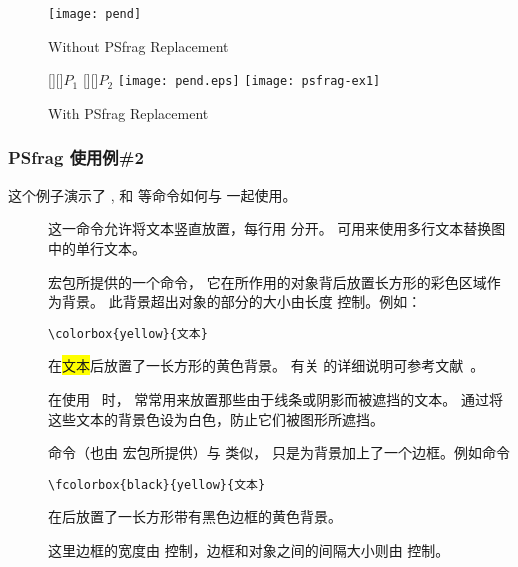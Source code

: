 \begin{figure}
\begin{minipage}[t]{.5\textwidth}
\vspace{0pt}
\centering
\texttt{[image: pend]}
\caption{Without PSfrag Replacement}\label{fig:nopsfrag}
\end{minipage}%
\begin{minipage}[t]{.5\textwidth}
\vspace{0pt}
\centering
\ifdvips
{}
[][]{$P_1$}
[][]{\large $P_2$}
\texttt{[image: pend.eps]}
\else
\texttt{[image: psfrag-ex1]}
\fi
\caption{With PSfrag Replacement}\label{fig:psfragex1}
\end{minipage}
\end{figure}

\subsubsection{PSfrag 使用例\#2}\label{sssec:psfragex2}

这个例子演示了 ,  和  等命令如何与  一起使用。

\begin{description}
\item[] 这一命令允许将文本竖直放置，每行用 \cmd{\cmd{}}分开。
	可用来使用多行文本替换图中的单行文本。
\item[]  宏包所提供的一个命令，
	它在所作用的对象背后放置长方形的彩色区域作为背景。
	此背景超出对象的部分的大小由长度  控制。例如：
\begin{lstlisting}
\colorbox{yellow}{文本}
\end{lstlisting}
	在{\colorbox{yellow}{文本}}后放置了一长方形的黄色背景。
	有关 的详细说明可参考文献~\cite{grfguide}。

	在使用 ~时， 常常用来放置那些由于线条或阴影而被遮挡的文本。
	通过将这些文本的背景色设为白色，防止它们被图形所遮挡。
\item[] 命令（也由  宏包所提供）与  类似，
	只是为背景加上了一个边框。例如命令
\begin{Verbatim}
\fcolorbox{black}{yellow}{文本}
\end{Verbatim}
	在{}后放置了一长方形带有黑色边框的黄色背景。

	这里边框的宽度由  控制，边框和对象之间的间隔大小则由  控制。
\end{description}


